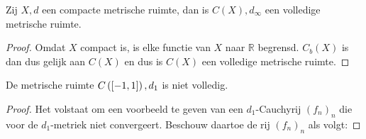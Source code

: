 \documentclass[main.tex]{subfiles}
\begin{document}
\begin{gev}
  Zij $X,d$ een compacte metrische ruimte, dan is $C(X),d_{\infty}$ een volledige metrische ruimte.

  \begin{proof}
    Omdat $X$ compact is, is elke functie van $X$ naar $\mathbb{R}$ begrensd.
    $C_{b}(X)$ is dan dus gelijk aan $C(X)$ en dus is $C(X)$ een volledige metrische ruimte.
  \end{proof}
\end{gev}

\begin{bpr}
  De metrische ruimte $C\left( \interval{-1}{1} \right),d_{1}$ is niet volledig.

  \begin{proof}
    Het volstaat om een voorbeeld te geven van een $d_{1}$-Cauchyrij $(f_{n})_{n}$ die voor de $d_{1}$-metriek niet convergeert.
    Beschouw daartoe de rij $(f_{n})_{n}$ als volgt:


\end{proof}
\end{bpr}
\end{document}
